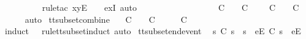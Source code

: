 \begin{isabellebody}
\ \ \ \ \ \ \ \ \isamarkupfalse%
\ {\isacharparenleft}rule{\isacharunderscore}tac\ x{\isacharequal}{\isachardoublequoteopen}{\isacharbrackleft}y{\isacharbrackright}\isactrlsub E\ {\isacharhash}\ {\isasymrho}{\isacharprime}{\isachardoublequoteclose}\ \ exI{\isacharcomma}\ auto{\isacharparenright}\isanewline
\ \ \ \ \isamarkupfalse%
\isanewline
\ \ \isamarkupfalse%
\ \ \ \ \isanewline
\ \ \isamarkupfalse%
\ \isamarkupfalse%
\ {\isachardoublequoteopen}{\isasymsigma}{\isacharprime}\ {\isasymle}\isactrlsub C\ {\isasymsigma}\ {\isasymLongrightarrow}\ {\isasymrho}\ {\isasymsubseteq}\isactrlsub C\ {\isasymsigma}\ {\isasymLongrightarrow}\ {\isasymexists}{\isasymrho}{\isacharprime}{\isachardot}\ {\isasymrho}{\isacharprime}\ {\isasymsubseteq}\isactrlsub C\ {\isasymsigma}{\isacharprime}\ {\isasymand}\ {\isasymrho}{\isacharprime}\ {\isasymle}\isactrlsub C\ {\isasymrho}{\isachardoublequoteclose}\isanewline
\ \ \ \ \isamarkupfalse%
\ auto\isanewline
{}\isamarkupfalse%
%
\endisatagproof
{\isafoldproof}%
%
\isadelimproof
\isanewline
%
\endisadelimproof
\isanewline
{}\isamarkupfalse%
\ tt{\isacharunderscore}subset{\isacharunderscore}combine{\isacharcolon}\isanewline
\ \ {\isachardoublequoteopen}{\isasymrho}{\isacharprime}\ {\isasymsubseteq}\isactrlsub C\ {\isasymrho}\ {\isasymLongrightarrow}\ {\isasymsigma}{\isacharprime}\ {\isasymsubseteq}\isactrlsub C\ {\isasymsigma}\ {\isasymLongrightarrow}\ {\isasymrho}{\isacharprime}\ {\isacharat}\ {\isasymsigma}{\isacharprime}\ {\isasymsubseteq}\isactrlsub C\ {\isasymrho}\ {\isacharat}\ {\isasymsigma}{\isachardoublequoteclose}\isanewline
%
\isadelimproof
\ \ %
\endisadelimproof
%
\isatagproof
{}\isamarkupfalse%
\ {\isacharparenleft}induct\ {\isasymrho}{\isacharprime}\ {\isasymrho}\ rule{\isacharcolon}tt{\isacharunderscore}subset{\isachardot}induct{\isacharcomma}\ auto{\isacharparenright}%
\endisatagproof
{\isafoldproof}%
%
\isadelimproof
\isanewline
%
\endisadelimproof
\isanewline
{}\isamarkupfalse%
\ tt{\isacharunderscore}subset{\isacharunderscore}end{\isacharunderscore}event{\isacharcolon}\isanewline
\ \ {\isachardoublequoteopen}s{\isacharprime}\ {\isasymsubseteq}\isactrlsub C\ s\ {\isasymLongrightarrow}\ s{\isacharprime}\ {\isacharat}\ {\isacharbrackleft}{\isacharbrackleft}e{\isacharbrackright}\isactrlsub E{\isacharbrackright}\ {\isasymsubseteq}\isactrlsub C\ s\ {\isacharat}\ {\isacharbrackleft}{\isacharbrackleft}e{\isacharbrackright}\isactrlsub E{\isacharbrackright}{\isachardoublequoteclose}\isanewline

\end{isabellebody}
